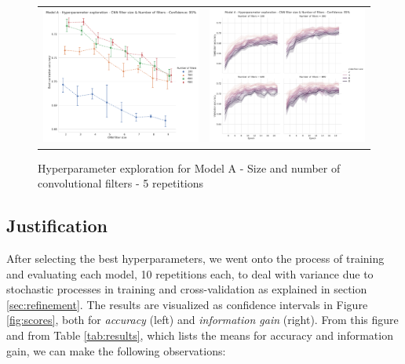 \documentclass[10pt,journal,compsoc, onecolumn]{IEEEtran}
\begin{document}
\begin{figure}[h]
\begin{tabular}{c c}
    \includegraphics[width=.499\linewidth]{images/chart_14.pdf} &
    \includegraphics[width=.501\linewidth]{images/chart_15.pdf} \\
\end{tabular}
\caption{Hyperparameter exploration for Model A - Size and number of convolutional filters - 5 repetitions}
\label{fig:explorationphase1}
\end{figure}

\subsection{Justification}\label{sec:justification}

After selecting the best hyperparameters, we went onto the process of training and evaluating each model, 10 repetitions each, to deal with variance due to stochastic processes in training and cross-validation as explained in section \ref{sec:refinement}. The results are visualized as confidence intervals in Figure \ref{fig:scores}, both for \textit{accuracy} (left) and \textit{information gain} (right). From this figure and from Table \ref{tab:results}, which lists the means for accuracy and information gain, we can make the following observations:
\end{document}
